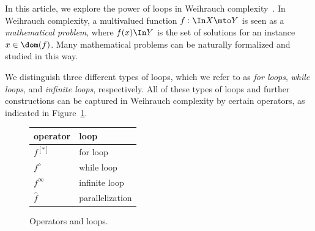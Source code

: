 \documentclass{lmcs}
\begin{document}
In this article, we explore the power of loops in Weihrauch complexity~\cite{BGP21}.
In Weihrauch complexity, a multivalued function $f:\In X\mto Y$ is seen as a {\em mathematical problem},
where $f(x)\In Y$ is the set of solutions for an instance $x\in\dom(f)$.
Many mathematical problems can be naturally formalized and studied in this way.

We distinguish three different types of loops, which we refer to as {\em for loops}, {\em while loops}, and {\em infinite loops},
respectively. All of these types of loops and further constructions 
can be captured in Weihrauch complexity by certain operators, as indicated
in Figure~\ref{fig:operators-loops}.

\begin{figure}[h]
	\centering
	\begin{tabular}{l|l}
		{\bf operator} & {\bf loop}\\\hline
		$f^{[*]}$ & for loop\\
		$f^\diamond$ & while loop\\
		$f^\infty$ & infinite loop\\
		$\widehat{f}$ & parallelization
	\end{tabular}
	\caption{Operators and loops.}
	\label{fig:operators-loops}
\end{figure}
\end{document}
